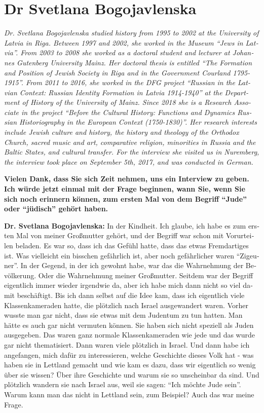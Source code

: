 \section{Dr Svetlana Bogojavlenska}
\begin{otherlanguage}{ngerman}
\textit{Dr. Svetlana Bogojavlenska studied history from 1995 to 2002 at the University of Latvia in Riga. Between 1997 and 2002, she worked in the Museum ``Jews in Latvia''. From 2003 to 2008 she worked as a doctoral student and lecturer at Johannes Gutenberg University Mainz. Her doctoral thesis is entitled ``The Formation and Position of Jewish Society in Riga and in the Government Courland 1795-1915''. From 2011 to 2016, she worked in the DFG project ``Russian in the Latvian Context: Russian Identity Formation in Latvia 1914-1940'' at the Department of History of the University of Mainz. Since 2018 she is a Research Associate in the project ``Before the Cultural History: Functions and Dynamics Russian Historiography in the European Context (1750-1830)''. Her research interests include Jewish culture and history, the history and theology of the Orthodox Church, sacred music and art, comparative religion, minorities in Russia and the Baltic States, and cultural transfer.
For the interview she visited us in Nuremberg, the interview took place on September 5th, 2017, and was conducted in German.}\par
\vspace*{2em}
\textbf{Vielen Dank, dass Sie sich Zeit nehmen, uns ein Interview zu geben. Ich würde jetzt einmal mit der Frage beginnen, wann Sie, wenn Sie sich noch erinnern können, zum ersten Mal von dem Begriff "`Jude"' oder "`jüdisch"' gehört haben.}

\textbf{Dr. Svetlana Bogojavlenska:} In der Kindheit. Ich glaube, ich habe es zum ersten Mal von meiner Großmutter gehört, und der Begriff war schon mit Vorurteilen beladen. Es war so, dass ich das Gefühl hatte, dass das etwas Fremdartiges ist. Was vielleicht ein bisschen gefährlich ist, aber noch gefährlicher waren "`Zigeuner"'. In der Gegend, in der ich gewohnt habe, war das die Wahrnehmung der Bevölkerung. Oder die Wahrnehmung meiner Großmutter. Seitdem war der Begriff eigentlich immer wieder irgendwie da, aber ich habe mich dann nicht so viel damit beschäftigt. Bis ich dann selbst auf die Idee kam, dass ich eigentlich viele Klassenkameraden hatte, die plötzlich nach Israel ausgewandert waren.
Vorher wusste man gar nicht, dass sie etwas mit dem Judentum zu tun hatten. Man hätte es auch gar nicht vermuten können. Sie haben sich nicht speziell als Juden ausgegeben. Das waren ganz normale Klassenkameraden wie jede und das wurde gar nicht thematisiert. Dann waren viele plötzlich in Israel. Und dann habe ich angefangen, mich dafür zu interessieren, welche Geschichte dieses Volk hat - was haben sie in Lettland gemacht und wie kam es dazu, dass wir eigentlich so wenig über sie wissen? Über ihre Geschichte und warum sie so unscheinbar da sind. Und plötzlich wandern sie nach Israel aus, weil sie sagen: "`Ich möchte Jude sein"'. Warum kann man das nicht in Lettland sein, zum Beispiel? Auch das war meine Frage.


\end{otherlanguage}
